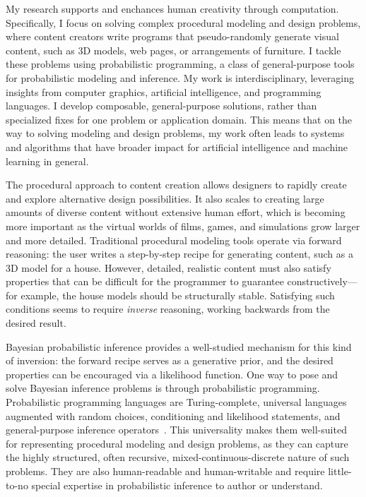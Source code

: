 \documentclass[
10pt, %
a4paper, %
oneside, %
headinclude,footinclude, %
BCOR5mm, %
]{scrartcl}
\title{\normalfont\spacedallcaps{Daniel Ritchie}} %
\author{\spacedallcaps{Research Statement}} %
\date{} %
\begin{document}

\pagestyle{scrheadings}
\clearscrheadings
\newcommand{\headertext}{\spacedlowsmallcaps{\color{black} Daniel Ritchie \color{halfgray} Research Statement}}
\ohead{\headertext}
\cfoot[\pagemark]{\pagemark}


\maketitle

My research supports and enchances human creativity through computation.
Specifically, I focus on solving complex procedural modeling and design problems, where content creators write programs that pseudo-randomly generate visual content, such as 3D models, web pages, or arrangements of furniture. I tackle these problems using probabilistic programming, a class of general-purpose tools for probabilistic modeling and inference.
My work is interdisciplinary, leveraging insights from computer graphics, artificial intelligence, and programming languages. I develop composable, general-purpose solutions, rather than specialized fixes for one problem or application domain. This means that on the way to solving modeling and design problems, my work often leads to systems and algorithms that have broader impact for artificial intelligence and machine learning in general.

The procedural approach to content creation allows designers to rapidly create and explore alternative design possibilities. It also scales to creating large amounts of diverse content without extensive human effort, which is becoming more important as the virtual worlds of films, games, and simulations grow larger and more detailed. Traditional procedural modeling tools operate via forward reasoning: the user writes a step-by-step recipe for generating content, such as a 3D model for a house. However, detailed, realistic content must also satisfy properties that can be difficult for the programmer to guarantee constructively---for example, the house models should be structurally stable. Satisfying such conditions seems to require \emph{inverse} reasoning, working backwards from the desired result.

Bayesian probabilistic inference provides a well-studied mechanism for this kind of inversion: the forward recipe serves as a generative prior, and the desired properties can be encouraged via a likelihood function. One way to pose and solve Bayesian inference problems is through probabilistic programming.
Probabilistic programming languages are Turing-complete, universal languages augmented with random choices, conditioning and likelihood statements, and general-purpose inference operators~\cite{Church}. This universality makes them well-suited for representing procedural modeling and design problems, as they can capture the highly structured, often recursive, mixed-continuous-discrete nature of such problems. They are also human-readable and human-writable and require little-to-no special expertise in probabilistic inference to author or understand.
\end{document}
